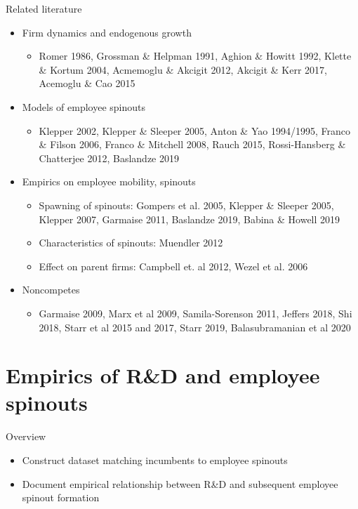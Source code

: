 \documentclass[english,usenames,dvipsnames]{beamer}
\begin{document}
\begin{frame}{Related literature}
\begin{itemize}
\small
\item Firm dynamics and endogenous growth
\begin{itemize}
\item Romer 1986, Grossman \& Helpman 1991, Aghion \& Howitt 1992, Klette \& Kortum 2004, Acmemoglu \& Akcigit 2012, Akcigit \& Kerr 2017, Acemoglu \& Cao 2015
\end{itemize}
\smallskip
\item Models of employee spinouts
\begin{itemize}
\item Klepper 2002, Klepper \& Sleeper 2005, Anton \& Yao 1994/1995, Franco \& Filson 2006, Franco \& Mitchell 2008, Rauch 2015, Rossi-Hansberg \& Chatterjee 2012, Baslandze 2019
\end{itemize}
\smallskip
\item Empirics on employee mobility, spinouts
\begin{itemize}
\item Spawning of spinouts: Gompers et al. 2005, Klepper \& Sleeper 2005, Klepper 2007, Garmaise 2011, Baslandze 2019, Babina \& Howell 2019
\item Characteristics of spinouts: Muendler 2012
\item Effect on parent firms: Campbell et. al 2012, Wezel et al. 2006
\end{itemize}
\smallskip
\item Noncompetes
\begin{itemize}
	\item Garmaise 2009, Marx et al 2009, Samila-Sorenson 2011, Jeffers 2018, Shi 2018, Starr et al 2015 and 2017, Starr 2019, Balasubramanian et al 2020
\end{itemize}
\end{itemize}
\end{frame}

\section{Empirics of R\&D and employee spinouts}

\begin{frame}
	\tableofcontents[currentsection]
\end{frame}

\begin{frame}{Overview}
	\begin{itemize}
		\item Construct dataset matching incumbents to employee spinouts
		\smallskip
		\item Document empirical relationship between R\&D and subsequent employee spinout formation
	\end{itemize}
\end{frame}
\end{document}
